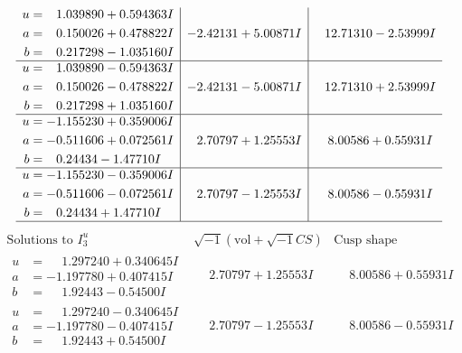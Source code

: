 \documentclass[1p]{elsarticle_modified}
\theoremstyle{definition}
\newcommand{\I}{\sqrt{-1}}
\begin{document}
$$\begin{array}{c|c|c}
\begin{aligned}
u &= \phantom{-}1.039890 + 0.594363 I \\
a &= \phantom{-}0.150026 + 0.478822 I \\
b &= \phantom{-}0.217298 - 1.035160 I\end{aligned}
 & -2.42131 + 5.00871 I & \phantom{-}12.71310 - 2.53999 I \\ \hline\begin{aligned}
u &= \phantom{-}1.039890 - 0.594363 I \\
a &= \phantom{-}0.150026 - 0.478822 I \\
b &= \phantom{-}0.217298 + 1.035160 I\end{aligned}
 & -2.42131 - 5.00871 I & \phantom{-}12.71310 + 2.53999 I \\ \hline\begin{aligned}
u &= -1.155230 + 0.359006 I \\
a &= -0.511606 + 0.072561 I \\
b &= \phantom{-}0.24434 - 1.47710 I\end{aligned}
 & \phantom{-}2.70797 + 1.25553 I & \phantom{-}8.00586 + 0.55931 I \\ \hline\begin{aligned}
u &= -1.155230 - 0.359006 I \\
a &= -0.511606 - 0.072561 I \\
b &= \phantom{-}0.24434 + 1.47710 I\end{aligned}
 & \phantom{-}2.70797 - 1.25553 I & \phantom{-}8.00586 - 0.55931 I\\
 \hline 
 \end{array}$$\newpage$$\begin{array}{c|c|c}  
\text{Solutions to }I^u_{3}& \I (\text{vol} + \sqrt{-1}CS) & \text{Cusp shape}\\
 \hline 
\begin{aligned}
u &= \phantom{-}1.297240 + 0.340645 I \\
a &= -1.197780 + 0.407415 I \\
b &= \phantom{-}1.92443 - 0.54500 I\end{aligned}
 & \phantom{-}2.70797 + 1.25553 I & \phantom{-}8.00586 + 0.55931 I \\ \hline\begin{aligned}
u &= \phantom{-}1.297240 - 0.340645 I \\
a &= -1.197780 - 0.407415 I \\
b &= \phantom{-}1.92443 + 0.54500 I\end{aligned}
 & \phantom{-}2.70797 - 1.25553 I & \phantom{-}8.00586 - 0.55931 I \\ \hline\begin{aligned}

\end{aligned}
\end{array}$$
\end{document}
